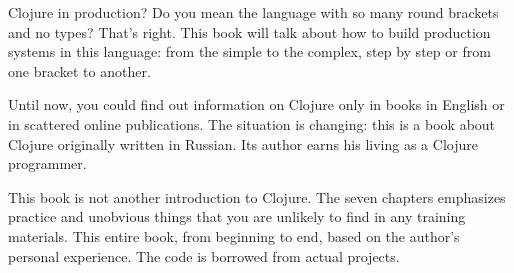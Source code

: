 
Clojure in production? Do you mean the language with so many round brackets and no types? That's right. 
This book will talk about how to build production systems in this language: from the simple to
the complex, step by step or from one bracket to another. 

Until now, you could find out information on Clojure only in books in English or
in scattered online publications. The situation is changing: this is a book about Clojure originally written in Russian. 
Its author earns his living as a Clojure programmer.

This book is not another introduction to Clojure. The seven chapters emphasizes practice and unobvious things 
that you are unlikely to find in any training materials. This entire book, from beginning to end, based on the author's personal experience. 
The code is borrowed from actual projects.
